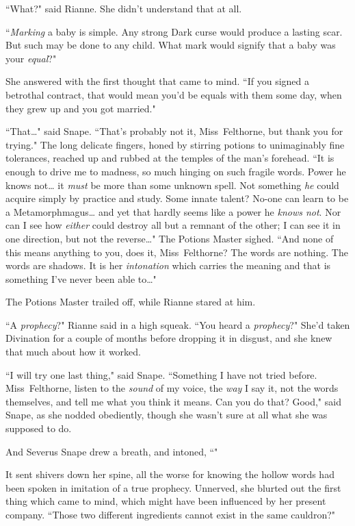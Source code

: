 ``What?" said Rianne. She didn't understand that at all.

``\emph{Marking} a baby is simple. Any strong Dark curse would produce a lasting scar. But such may be done to any child. What mark would signify that a baby was your \emph{equal}?"

She answered with the first thought that came to mind. ``If you signed a betrothal contract, that would mean you'd be equals with them some day, when they grew up and you got married."

``That{\ldots}" said Snape. ``That's probably not it, Miss~Felthorne, but thank you for trying." The long delicate fingers, honed by stirring potions to unimaginably fine tolerances, reached up and rubbed at the temples of the man's forehead. ``It is enough to drive me to madness, so much hinging on such fragile words. Power he knows not{\ldots} it \emph{must} be more than some unknown spell. Not something \emph{he} could acquire simply by practice and study. Some innate talent? No-one can learn to be a Metamorphmagus{\ldots} and yet that hardly seems like a power he \emph{knows not}. Nor can I see how \emph{either} could destroy all but a remnant of the other; I can see it in one direction, but not the reverse{\ldots}" The Potions Master sighed. ``And none of this means anything to you, does it, Miss~Felthorne? The words are nothing. The words are shadows. It is her \emph{intonation} which carries the meaning and that is something I've never been able to{\ldots}"

The Potions Master trailed off, while Rianne stared at him.

``A \emph{prophecy}?" Rianne said in a high squeak. ``You heard a \emph{prophecy}?" She'd taken Divination for a couple of months before dropping it in disgust, and she knew that much about how it worked.

``I will try one last thing," said Snape. ``Something I have not tried before. Miss~Felthorne, listen to the \emph{sound} of my voice, the \emph{way} I say it, not the words themselves, and tell me what you think it means. Can you do that? Good," said Snape, as she nodded obediently, though she wasn't sure at all what she was supposed to do.

And Severus Snape drew a breath, and intoned, ``"

It sent shivers down her spine, all the worse for knowing the hollow words had been spoken in imitation of a true prophecy. Unnerved, she blurted out the first thing which came to mind, which might have been influenced by her present company. ``Those two different ingredients cannot exist in the same cauldron?"

